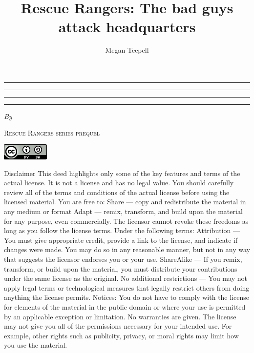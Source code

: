 \documentclass[12pt,twoside,onecolumn,openright,extrafontsizes]{memoir}
\title{Rescue Rangers: The bad guys attack headquarters}
\author{Megan Teepell}
\newcommand{\press}{Rescue Rangers series prequel}
\newcommand*\halftitlepage{\begingroup %
  \setlength\drop{0.1\textheight}
  \begin{center}
  \vspace*{\drop}
  \rule{\textwidth}{0in}\par
  {\Large\textsc\thetitle\par}
  \rule{\textwidth}{0in}\par
  \vfill
  \end{center}
\endgroup}
\newlength\drop
\newcommand*\titleM{\begingroup %
  \setlength\drop{0.15\textheight}
  \begin{center}
  \vspace*{\drop}
  \rule{\textwidth}{0in}\par
  {\HUGE\textsc\thetitle\par}
  \rule{\textwidth}{0in}\par
  {\Large\textit{By \theauthor}\par}
  \vfill
  {\Large\scshape\press}
  \end{center}
\endgroup}
\begin{document}
\pagestyle{empty}
\halftitlepage
\cleardoublepage
\titleM
\clearpage

\begin{center}
 	\centering
	\includegraphics[width=0.25\linewidth=0.25]{license.png}
\end{center}

\newpage
{\tiny Disclaimer This deed highlights only some of the key features and terms of the actual license. It is not a license and has no legal value. You should carefully review all of the terms and conditions of the actual license before using the licensed material. You are free to: Share — copy and redistribute the material in any medium or format Adapt — remix, transform, and build upon the material
for any purpose, even commercially. The licensor cannot revoke these freedoms as long as you follow the license terms. Under the following terms: Attribution — You must give appropriate credit, provide a link to the license, and indicate if changes were made. You may do so in any reasonable manner, but not in any way that suggests the licensor endorses you or your use. ShareAlike — If you remix, transform, or build upon the material, you must distribute your contributions under the same license as the original. No additional restrictions — You may not apply legal terms or technological measures that legally restrict others from doing anything the license permits. Notices: You do not have to comply with the license for elements of the material in the public domain or where your use is permitted by an applicable exception or limitation. No warranties are given. The license may not give you all of the permissions necessary for your intended use. For example, other rights such as publicity, privacy, or moral rights may limit how you use the material.
}
\clearpage
\end{document}
